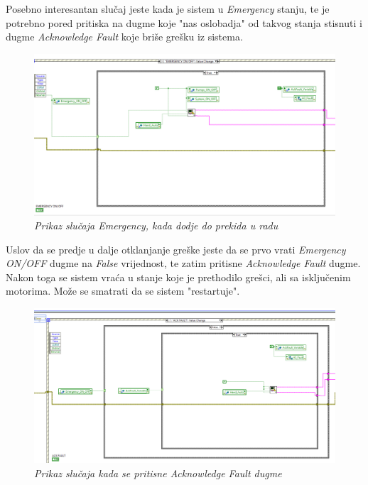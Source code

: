 \documentclass[12pt, titlepage]{article}
\begin{document}
            Posebno interesantan slučaj jeste kada je sistem u \textit{Emergency} stanju, te je potrebno
            pored pritiska na dugme koje "nas oslobadja" od takvog stanja stisnuti i 
            dugme \textit{Acknowledge Fault} koje briše grešku iz sistema.

            \begin{figure}[ht]
                \centering 
                \includegraphics[width=\textwidth]{Slike/SCADA.vi EMERGENCY CASE.png}
                \caption{\textit{Prikaz slučaja Emergency, kada dodje do prekida u radu}}
            \end{figure}

            Uslov da se predje u dalje otklanjanje greške jeste da se prvo vrati \textit{Emergency ON/OFF}
            dugme na \textit{False} vrijednost, te zatim pritisne \textit{Acknowledge Fault} dugme.
            Nakon toga se sistem vraća u stanje koje je prethodilo grešci, ali sa isključenim motorima. 
            Može se smatrati da se sistem "restartuje".

            \newpage

            \begin{figure}[ht]
                \centering
                \includegraphics[width=\textwidth]{Slike/SCADA.vi ACK FAULT CASE.png}
                \caption{\textit{Prikaz slučaja kada se pritisne Acknowledge Fault dugme}}
            \end{figure}
        
\end{document}
